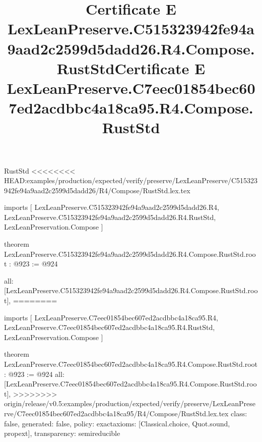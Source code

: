 \begin{lexlean}{RustStd}
<<<<<<<< HEAD:examples/production/expected/verify/preserve/LexLeanPreserve/C515323942fe94a9aad2c2599d5dadd26/R4/Compose/RustStd.lex.tex
\title{Certificate E LexLeanPreserve.C515323942fe94a9aad2c2599d5dadd26.R4.Compose.RustStd}
\begin{coremodule}
imports [
  LexLeanPreserve.C515323942fe94a9aad2c2599d5dadd26.R4,
  LexLeanPreserve.C515323942fe94a9aad2c2599d5dadd26.R4.RustStd,
  LexLeanPreservation.Compose
]

theorem LexLeanPreserve.C515323942fe94a9aad2c2599d5dadd26.R4.Compose.RustStd.root : @923 := @924 {
  all: [LexLeanPreserve.C515323942fe94a9aad2c2599d5dadd26.R4.Compose.RustStd.root],
========
\title{Certificate E LexLeanPreserve.C7eec01854bec607ed2acdbbc4a18ca95.R4.Compose.RustStd}
\begin{coremodule}
imports [
  LexLeanPreserve.C7eec01854bec607ed2acdbbc4a18ca95.R4,
  LexLeanPreserve.C7eec01854bec607ed2acdbbc4a18ca95.R4.RustStd,
  LexLeanPreservation.Compose
]

theorem LexLeanPreserve.C7eec01854bec607ed2acdbbc4a18ca95.R4.Compose.RustStd.root : @923 := @924 {
  all: [LexLeanPreserve.C7eec01854bec607ed2acdbbc4a18ca95.R4.Compose.RustStd.root],
>>>>>>>> origin/release/v0.5:examples/production/expected/verify/preserve/LexLeanPreserve/C7eec01854bec607ed2acdbbc4a18ca95/R4/Compose/RustStd.lex.tex
  class: false,
  generated: false,
  policy: exact{axioms: [Classical.choice, Quot.sound, propext]},
  transparency: semireducible
}


\end{coremodule}}
\end{coremodule}
\end{lexlean}

